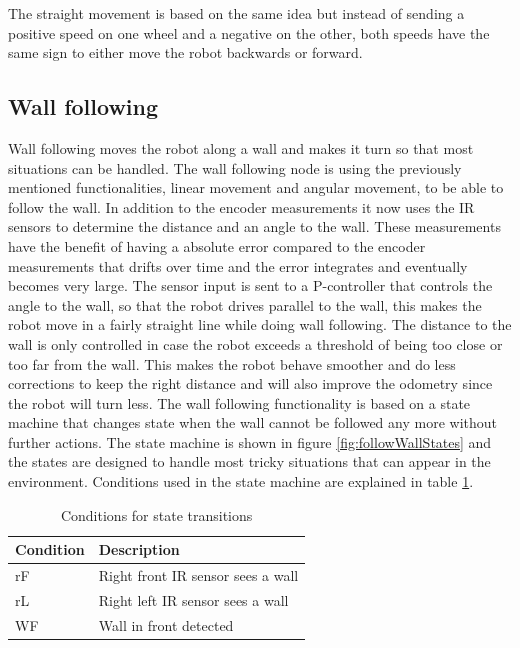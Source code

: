 The straight movement is based on the same idea but instead of sending a positive speed on one wheel and a negative on the other, both speeds have the same sign to either move the robot backwards or forward. 

\subsection{Wall following}
\label{subsec:wallFollowing}

Wall following moves the robot along a wall and makes it turn so that most situations can be handled. The wall following node is using the previously mentioned functionalities, linear movement and angular movement, to be able to follow the wall. In addition to the encoder measurements it now uses the IR sensors to determine the distance and an angle to the wall. These measurements have the benefit of having a absolute error compared to the encoder measurements that drifts over time and the error integrates and eventually becomes very large.
	The sensor input is sent to a P-controller that controls the angle to the wall, so that the robot drives parallel to the wall, this makes the robot move in a fairly straight line while doing wall following. The distance to the wall is only controlled in case the robot exceeds a threshold of being too close or too far from the wall. This makes the robot behave smoother and do less corrections to keep the right distance and will also improve the odometry since the robot will turn less.
	The wall following functionality is based on a state machine that changes state when the wall cannot be followed any more without further actions. The state machine is shown in figure  \ref{fig:followWallStates} and the states are designed to handle most tricky situations that can appear in the environment. Conditions used in the state machine are explained in table \ref{tab:conditions}.

\begin{table}[h!]
\caption{Conditions for state transitions}
\centering
  \begin{tabular}{l|l}
    \textbf{Condition} & \textbf{Description} \\ \hline
    rF & Right front IR sensor sees a wall \\ \hline
    rL & Right left IR sensor sees a wall \\ \hline
    WF & Wall in front detected \\
  \end{tabular}
  \label{tab:conditions}
\normalsize
\end{table}

